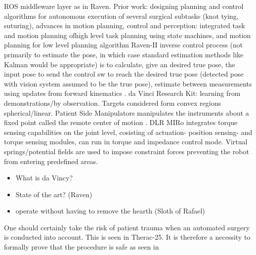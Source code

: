 ROS middleware layer as in Raven.
Prior work: designing planning and control algorithms for autonomous execution of several surgical subtasks (knot tying, suturing), advances in motion planning, control and perception: integrated task and motion planning ofhigh level task planning using state machines, and motion planning for low level planning algorithm  \citep{bib:raven_debride}
Raven-II inverse control process (not primarily to estimate the pose, in which case standard estimation methods like Kalman would be appropriate) is to calculate, give an desired true pose, the input pose to send the control sw to reach the desired true pose (detected pose with vision system assumed to be the true pose), estimate between measurements using updates from forward kinematics \citep{bib:raven_debride}.
da Vinci Research Kit: learning from demonstrations/by observation. Targets considered form convex regions spherical/linear. Patient Side Manipulators manipulates the instruments about a fixed point called the remote center of motion \citep{bib:raven_observ}.
DLR MIRo integrates torque sensing capabilities on the joint level, cosisting of actuation- position sensing- and torque sensing modules, can run in torque and impedance control mode. Virtual springs/potential fields are used to impose constraint forces preventing the robot from  entering predefined areas.



\begin{itemize}
\item What is da Vincy?
\item State of the art? (Raven)
\item operate without having to remove the hearth (Sloth of Rafael)
\end{itemize}
One should certainly take the risk of patient trauma when an automated surgery is conducted into account. This is seen in Therac-25. It is therefore a necessity to formally prove that the procedure is safe as seen in \citep{bib:safety}